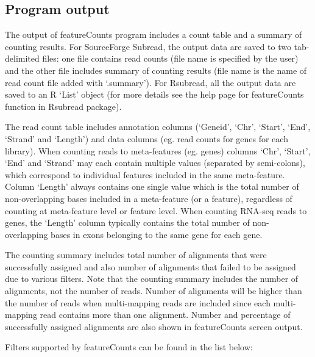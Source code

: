 \documentclass[12pt]{report}
\newcommand{\Subread}{\textsf{Subread}}
\newcommand{\Rsubread}{\textsf{Rsubread}}
\newcommand{\featureCounts}{\textsf{featureCounts}}
\newcommand{\R}{\textsf{R}}
\begin{document}
\subsection{Program output}
\label{sec:program_output}

The output of {\featureCounts} program includes a count table and a summary of counting results.
For SourceForge {\Subread}, the output data are saved to two tab-delimited files: one file contains read counts (file name is specified by the user) and the other file includes summary of counting results (file name is the name of read count file added with `.summary').
For {\Rsubread}, all the output data are saved to an {\R} `List' object (for more details see the help page for {\featureCounts} function in {\Rsubread} package). 

The read count table includes annotation columns (`Geneid', `Chr', `Start', `End', `Strand' and `Length') and data columns (eg. read counts for genes for each library).
When counting reads to meta-features (eg. genes) columns `Chr', `Start', `End' and `Strand' may each contain multiple values (separated by semi-colons), which correspond to individual features included in the same meta-feature. 
Column `Length' always contains one single value which is the total number of non-overlapping bases included in a meta-feature (or a feature), regardless of counting at meta-feature level or feature level.
When counting RNA-seq reads to genes, the `Length' column typically contains the total number of non-overlapping bases in exons belonging to the same gene for each gene.

The counting summary includes total number of alignments that were successfully assigned and also number of alignments that failed to be assigned due to various filters.
Note that the counting summary includes the number of alignments, not the number of reads.
Number of alignments will be higher than the number of reads when multi-mapping reads are included since each multi-mapping read contains more than one alignment.
Number and percentage of successfully assigned alignments are also shown in featureCounts screen output.

Filters supported by {\featureCounts} can be found in the list below:
\end{document}
